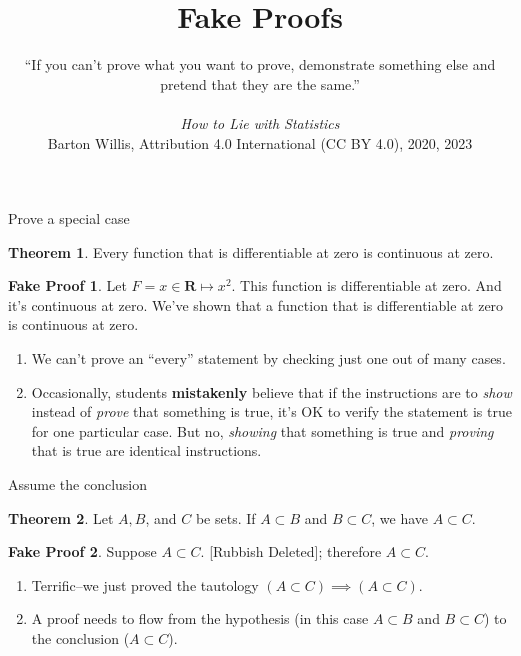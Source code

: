 \documentclass[fleqn]{beamer}
\title{\textbf{Fake Proofs}}
\subtitle{%
  ``If you can't prove what you want to prove, demonstrate something else and pretend that they are the same.''  \\   \vspace{0.15in}{Darrell Huff} \\ \vspace{0.15in} \emph{How to Lie with Statistics} \\ 
 \vspace{1.0in}
  \tiny Barton Willis, Attribution 4.0 International (CC BY 4.0), 2020, 2023 \normalsize
   }
\date{}
\newcommand{\reals}{\mathbf{R}}
\theoremstyle{definition}
\newtheorem{myth}{Theorem}
\newtheorem{myfakeproof}{Fake Proof}
\begin{document}
\frame{\titlepage}

\begin{frame}{Prove a special case}

\begin{myth}   Every function  that is differentiable at zero is continuous at zero.  \end{myth}

\begin{myfakeproof}  Let \(F = x \in \reals \mapsto x^2\).  This function is 
  differentiable at zero. And it's continuous at zero. We've shown that  a 
  function that is differentiable at zero is continuous at zero.
\end{myfakeproof}

\begin{enumerate}
\item We can't prove an ``every'' statement by checking just one out of many cases.
\item Occasionally, students \textbf{mistakenly} believe that if the instructions are 
to \emph{show} instead of \emph{prove} that something is true, it's OK to verify the 
statement is true for one particular case. But no, \emph{showing} that something is 
true and  \emph{proving} that is true are identical instructions.


\end{enumerate}

\end{frame}

\begin{frame}{Assume the conclusion}


\begin{myth}   Let \(A,B\),  and \(C\) be sets.  If \(A \subset B\) and \(B \subset C\), we have \(A \subset C\). \end{myth}

\begin{myfakeproof}  Suppose \(A \subset C\).  [Rubbish Deleted]; therefore  \(A \subset C\). \end{myfakeproof}

\begin{enumerate}
\item Terrific--we just proved the tautology \(   (A \subset C) \implies  (A \subset C) \).

\item A proof needs to flow from the hypothesis (in this case  \(A \subset B\) and \(B \subset C\)) to the conclusion (\(A \subset C\)).
\end{enumerate}

\end{frame}
\end{document}
